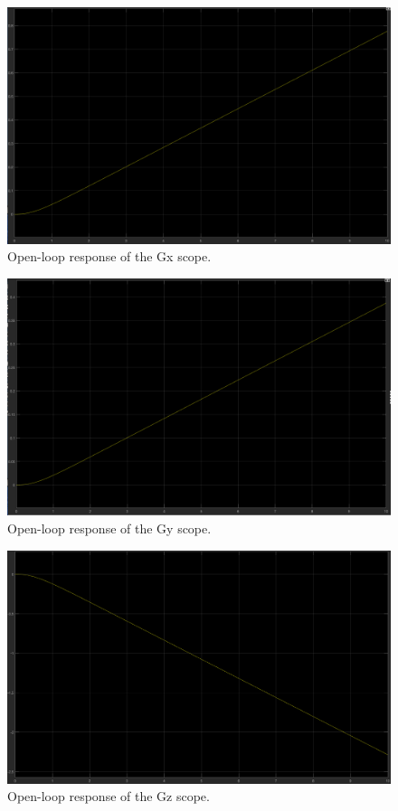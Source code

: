 \begin{figure}[H]
  \centering
    \includegraphics[width=1\textwidth]{images/Gx.png}
	\caption{Open-loop response of the Gx scope.}
	\label{openloop2}
\end{figure}

\begin{figure}[H]
  \centering
    \includegraphics[width=1\textwidth]{images/Gy.png}
	\caption{Open-loop response of the Gy scope.}
	\label{openloop3}
\end{figure}

\begin{figure}[H]
  \centering
    \includegraphics[width=1\textwidth]{images/Gz.png}
	\caption{Open-loop response of the Gz scope.}
	\label{openloop4}
\end{figure}

